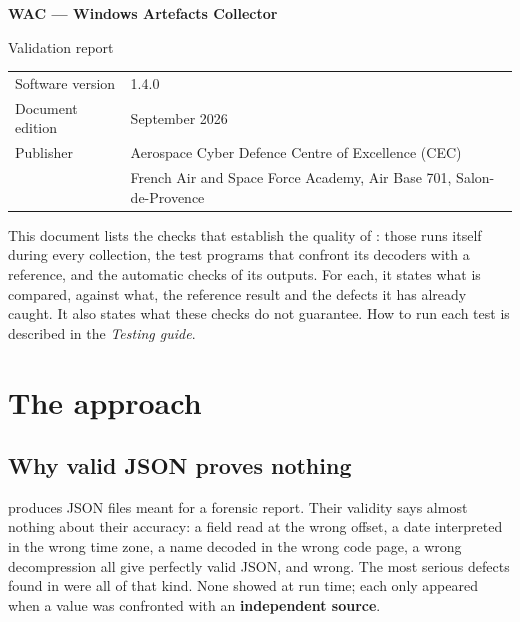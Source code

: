 \documentclass[11pt,a4paper,oneside]{report}
\begin{document}

\thispagestyle{empty}
\vspace*{\fill}
{\color{marine}\Large\bfseries WAC — Windows Artefacts Collector}\par
{\color{bleu}Validation report}\par
\medskip
\begin{tabular}{@{}ll@{}}
Software version & 1.4.0 \\
Document edition & September 2026 \\
Publisher & Aerospace Cyber Defence Centre of Excellence (CEC) \\
          & French Air and Space Force Academy, Air Base 701, Salon-de-Provence \\
\end{tabular}

\bigskip
{\small\color{gris}This document lists the checks that establish the quality
of \wac{}: those \wac{} runs itself during every collection, the test programs
that confront its decoders with a reference, and the automatic checks of its
outputs. For each, it states what is compared, against what, the reference
result and the defects it has already caught. It also states what these checks
do not guarantee. How to run each test is described in the \emph{Testing
guide}.}
\vspace*{2cm}
\clearpage

\tableofcontents

\chapter{The approach}

\section{Why valid JSON proves nothing}

\wac{} produces JSON files meant for a forensic report. Their validity says
almost nothing about their accuracy: a field read at the wrong offset, a date
interpreted in the wrong time zone, a name decoded in the wrong code page, a
wrong decompression all give perfectly valid JSON, and wrong. The most serious
defects found in \wac{} were all of that kind. None showed at run time; each
only appeared when a value was confronted with an \textbf{independent source}.
\end{document}
